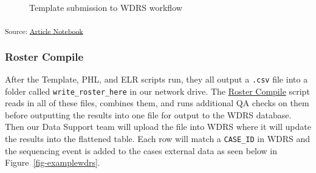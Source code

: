 \documentclass[
]{agujournal2019}
\begin{document}
\begin{figure}


\caption{\label{fig-templateflow}Template submission to WDRS workflow}

\end{figure}%

\textsubscript{Source:
\href{https://NW-PaGe.github.io/sequencing_integration_pipeline1.0/index.qmd.html}{Article
Notebook}}

\subsubsection{Roster Compile}\label{sec-rostercompile}

After the Template, PHL, and ELR scripts run, they all output a
\texttt{.csv} file into a folder called \texttt{write\_roster\_here} in
our network drive. The \href{ROSTER_COMPILE.Rmd}{Roster Compile} script
reads in all of these files, combines them, and runs additional QA
checks on them before outputting the results into one file for output to
the WDRS database. Then our Data Support team will upload the file into
WDRS where it will update the results into the flattened table. Each row
will match a \texttt{CASE\_ID} in WDRS and the sequencing event is added
to the cases external data as seen below in
Figure~\ref{fig-examplewdrs}.
\end{document}
